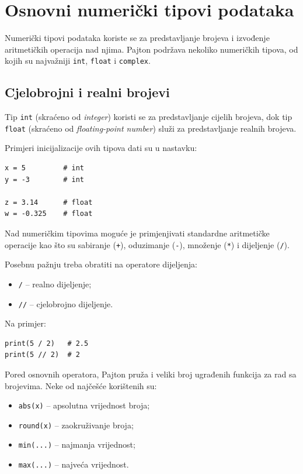 \section{Osnovni numerički tipovi podataka}

Numerički tipovi podataka koriste se za predstavljanje brojeva i izvođenje aritmetičkih operacija nad njima. Pajton podržava nekoliko numeričkih tipova, od kojih su najvažniji \texttt{int}, \texttt{float} i \texttt{complex}.

\subsection{Cjelobrojni i realni brojevi}

Tip \texttt{int} (skraćeno od \textit{integer}) koristi se za predstavljanje cijelih brojeva, dok tip \texttt{float} (skraćeno od \textit{floating-point number}) služi za predstavljanje realnih brojeva.

Primjeri inicijalizacije ovih tipova dati su u nastavku:

\begin{verbatim}
x = 5         # int
y = -3        # int

z = 3.14      # float
w = -0.325    # float
\end{verbatim}

Nad numeričkim tipovima moguće je primjenjivati standardne aritmetičke operacije kao što su sabiranje (\texttt{+}), oduzimanje (\texttt{-}), množenje (\texttt{*}) i dijeljenje (\texttt{/}).

Posebnu pažnju treba obratiti na operatore dijeljenja:

\begin{itemize}
	\item \texttt{/} -- realno dijeljenje;
	\item \texttt{//} -- cjelobrojno dijeljenje.
\end{itemize}

Na primjer:

\begin{verbatim}
print(5 / 2)   # 2.5
print(5 // 2)  # 2
\end{verbatim}

Pored osnovnih operatora, Pajton pruža i veliki broj ugrađenih funkcija za rad sa brojevima. Neke od najčešće korištenih su:

\begin{itemize}
	\item \texttt{abs(x)} -- apsolutna vrijednost broja;
	\item \texttt{round(x)} -- zaokruživanje broja;
	\item \texttt{min(...)} -- najmanja vrijednost;
	\item \texttt{max(...)} -- najveća vrijednost.
\end{itemize}

